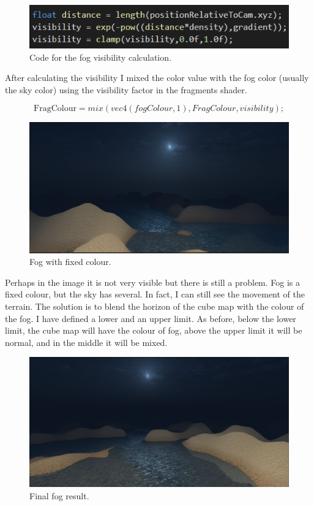 \begin{figure}[hbt!]
	\centering
	\includegraphics[width= 1
	\textwidth]{images/fog.png}
	\caption{Code for the fog visibility calculation.}
\end{figure}

After calculating the visibility I mixed the color value with the fog color (usually the sky color) using the visibility factor in the fragments shader.

\begin{equation}
\text{FragColour} = mix(vec4(fogColour,1), FragColour, visibility);
\end{equation}

\begin{figure}[hbt!]
	\centering
	\includegraphics[width= 1
	\textwidth]{images/fog1.png}
	\caption{Fog with fixed colour.}
\end{figure}

\noindent
Perhaps in the image it is not very visible but there is still a problem. Fog is a fixed colour, but the sky has several. In fact, I can still see the movement of the terrain. The solution is to blend the horizon of the cube map with the colour of the fog. I have defined a lower and an upper limit. As before, below the lower limit, the cube map will have the colour of fog, above the upper limit it will be normal, and in the middle it will be mixed.

\newpage

\begin{figure}[hbt!]
	\centering
	\includegraphics[width= 1
	\textwidth]{images/fog2.png}
	\caption{Final fog result.}
\end{figure}

